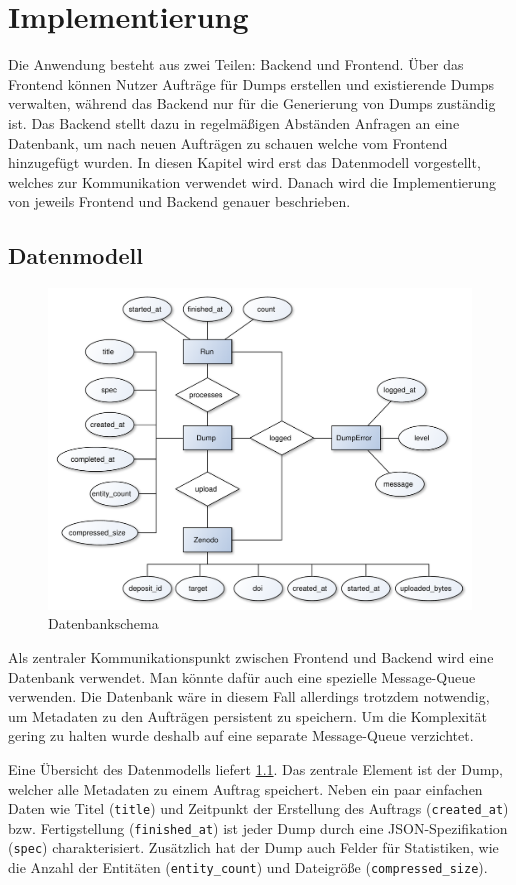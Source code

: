 \chapter{Implementierung}
\label{chap:implementation}

Die Anwendung besteht aus zwei Teilen: Backend und Frontend.
Über das Frontend können Nutzer Aufträge für Dumps erstellen und existierende Dumps verwalten, während das Backend nur für die Generierung von Dumps zuständig ist.
Das Backend stellt dazu in regelmäßigen Abständen Anfragen an eine Datenbank, um nach neuen Aufträgen zu schauen welche vom Frontend hinzugefügt wurden.
In diesen Kapitel wird erst das Datenmodell vorgestellt, welches zur Kommunikation verwendet wird.
Danach wird die Implementierung von jeweils Frontend und Backend genauer beschrieben.

\section{Datenmodell}
\begin{figure}
  \includegraphics[width=\textwidth]{pics/db-er}
  \caption{Datenbankschema}
  \label{fig:db-er}
\end{figure}
Als zentraler Kommunikationspunkt zwischen Frontend und Backend wird eine Datenbank verwendet.
Man könnte dafür auch eine spezielle Message-Queue verwenden.
Die Datenbank wäre in diesem Fall allerdings trotzdem notwendig, um Metadaten zu den Aufträgen persistent zu speichern.
Um die Komplexität gering zu halten wurde deshalb auf eine separate Message-Queue verzichtet.

Eine Übersicht des Datenmodells liefert \cref{fig:db-er}.
Das zentrale Element ist der Dump, welcher alle Metadaten zu einem Auftrag speichert.
Neben ein paar einfachen Daten wie Titel (\verb|title|) und Zeitpunkt der Erstellung des Auftrags (\verb|created_at|) bzw. Fertigstellung (\verb|finished_at|) ist jeder Dump durch eine JSON-Spezifikation (\verb|spec|) charakterisiert. Zusätzlich hat der Dump auch Felder für Statistiken, wie die Anzahl der Entitäten (\verb|entity_count|) und Dateigröße (\verb|compressed_size|).

